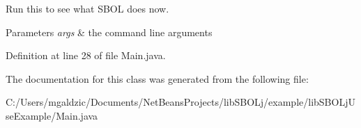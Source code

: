 Run this to see what SBOL does now. 


\begin{DoxyParams}{Parameters}
{\em args} & the command line arguments \\
\hline
\end{DoxyParams}


Definition at line 28 of file Main.java.



The documentation for this class was generated from the following file:\begin{DoxyCompactItemize}
\item 
C:/Users/mgaldzic/Documents/NetBeansProjects/libSBOLj/example/libSBOLjUseExample/Main.java\end{DoxyCompactItemize}
